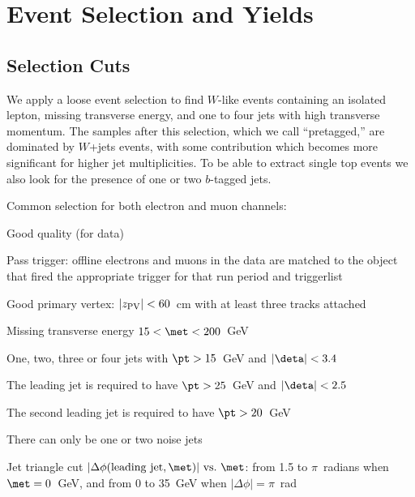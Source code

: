%
\section{Event Selection and Yields}
\label{selection-yields}

\subsection{Selection Cuts}
\label{selection-cuts}

We apply a loose event selection to find $W$-like events containing an
isolated lepton, missing transverse energy, and one to four jets with
high transverse momentum. The samples after this selection, which we
call ``pretagged,'' are dominated by $W$+jets events, with some
{\ttbar} contribution which becomes more significant for higher jet
multiplicities. To be able to extract single top events we also look
for the presence of one or two $b$-tagged jets.

Common selection for both electron and muon channels:
\vspace{-0.08in}
\begin{myitemize}
\item Good quality (for data)
\item Pass trigger: offline electrons and muons in the data are
matched to the object that fired the appropriate trigger for that
run period and triggerlist
\item Good primary vertex: $|z_{\rm PV}| < 60$~cm with at least three
tracks attached
\item Missing transverse energy $15 < {\met} < 200$~GeV
\item One, two, three or four jets with ${\pt} > 15$~GeV and
$|\deta|<3.4$ 
\item The leading jet is required to have ${\pt} > 25$~GeV and
$|\deta| < 2.5$
\item The second leading jet is required to have ${\pt} > 20$~GeV
\item There can only be one or two noise jets
\item Jet triangle cut $|\Delta\phi({\rm leading~jet,{\met}})|
{\rm ~vs.~}{\met}$: from 1.5 to $\pi$~radians when ${\met} = 0$~GeV,
and {\met} from 0 to 35~GeV when $|\Delta\phi| = \pi$~rad
\end{myitemize}

